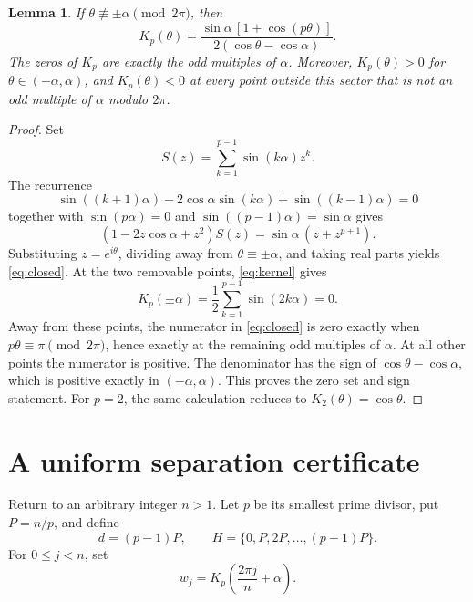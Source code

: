 \documentclass[11pt]{article}
\newtheorem{lemma}[theorem]{Lemma}
\numberwithin{equation}{section}
\begin{document}
\begin{lemma}\label{lem:kernel}
If $\theta\not\equiv\pm\alpha\pmod{2\pi}$, then
\begin{equation}
K_p(\theta)=
\frac{\sin\alpha\,[1+\cos(p\theta)]}
     {2(\cos\theta-\cos\alpha)}.
\label{eq:closed}
\end{equation}
The zeros of $K_p$ are exactly the odd multiples of $\alpha$. Moreover,
$K_p(\theta)>0$ for $\theta\in(-\alpha,\alpha)$, and $K_p(\theta)<0$ at
every point outside this sector that is not an odd multiple of $\alpha$ modulo
$2\pi$.
\end{lemma}

\begin{proof}
Set
\[
S(z)=\sum_{k=1}^{p-1}\sin(k\alpha)z^k.
\]
The recurrence
\[
\sin((k+1)\alpha)-2\cos\alpha\sin(k\alpha)
+\sin((k-1)\alpha)=0
\]
together with $\sin(p\alpha)=0$ and
$\sin((p-1)\alpha)=\sin\alpha$ gives
\begin{equation}
(1-2z\cos\alpha+z^2)S(z)=\sin\alpha\,(z+z^{p+1}).
\label{eq:generating}
\end{equation}
Substituting $z=e^{i\theta}$, dividing away from
$\theta\equiv\pm\alpha$, and taking real parts yields \eqref{eq:closed}.
At the two removable points, \eqref{eq:kernel} gives
\begin{equation}
K_p(\pm\alpha)=\frac12\sum_{k=1}^{p-1}\sin(2k\alpha)=0.
\label{eq:removable}
\end{equation}
Away from these points, the numerator in \eqref{eq:closed} is zero exactly
when $p\theta\equiv\pi\pmod{2\pi}$, hence exactly at the remaining odd
multiples of $\alpha$. At all other points the numerator is positive. The
denominator has the sign of $\cos\theta-\cos\alpha$, which is positive
exactly in $(-\alpha,\alpha)$. This proves the zero set and sign statement.
For $p=2$, the same calculation reduces to $K_2(\theta)=\cos\theta$.
\end{proof}

\section{A uniform separation certificate}\label{sec:certificate}

Return to an arbitrary integer $n>1$. Let $p$ be its smallest prime divisor,
put $P=n/p$, and define
\begin{equation}
d=(p-1)P,
\qquad
H=\{0,P,2P,\ldots,(p-1)P\}.
\label{eq:anchors}
\end{equation}
For $0\leq j<n$, set
\begin{equation}
w_j=K_p\!\left(\frac{2\pi j}{n}+\alpha\right).
\label{eq:weights}
\end{equation}
\end{document}

